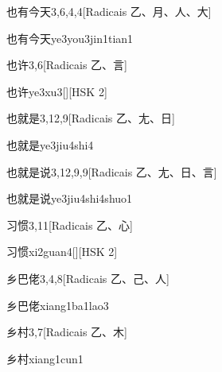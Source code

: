 \begin{entry}{也有今天}{3,6,4,4}[Radicais ⼄、⽉、⼈、⼤]
  \begin{phonetics}{也有今天}{ye3you3jin1tian1}
  \end{phonetics}
\end{entry}

\begin{entry}{也许}{3,6}[Radicais ⼄、⾔]
  \begin{phonetics}{也许}{ye3xu3}[][HSK 2]
  \end{phonetics}
\end{entry}

\begin{entry}{也就是}{3,12,9}[Radicais ⼄、⼪、⽇]
  \begin{phonetics}{也就是}{ye3jiu4shi4}
  \end{phonetics}
\end{entry}

\begin{entry}{也就是说}{3,12,9,9}[Radicais ⼄、⼪、⽇、⾔]
  \begin{phonetics}{也就是说}{ye3jiu4shi4shuo1}
  \end{phonetics}
\end{entry}

\begin{entry}{习惯}{3,11}[Radicais ⼄、⼼]
  \begin{phonetics}{习惯}{xi2guan4}[][HSK 2]
  \end{phonetics}
\end{entry}

\begin{entry}{乡巴佬}{3,4,8}[Radicais ⼄、⼰、⼈]
  \begin{phonetics}{乡巴佬}{xiang1ba1lao3}
  \end{phonetics}
\end{entry}

\begin{entry}{乡村}{3,7}[Radicais ⼄、⽊]
  \begin{phonetics}{乡村}{xiang1cun1}
  \end{phonetics}
\end{entry}

